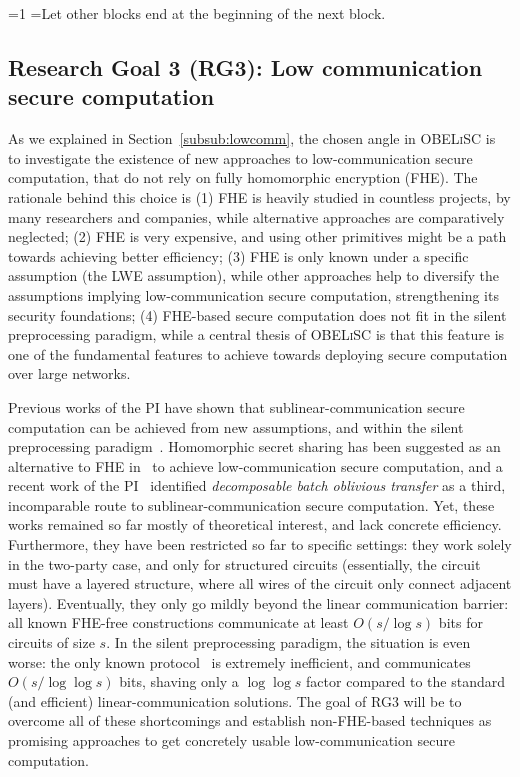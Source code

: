 \documentclass[oneside, a4paper, onecolumn, 11pt]{article}
\newcommand{\OBELiSC}{\textsc{OBELiSC}\xspace}
\newcounter{alphasect}
\def\alphainsection{0}
\newenvironment{alphasection}{%
  \ifnum\alphainsection=1%
    \errhelp={Let other blocks end at the beginning of the next block.}
    \errmessage{Nested Alpha section not allowed}
  \fi%
  \setcounter{alphasect}{0}
  \def\alphainsection{1}
}{%
  \setcounter{alphasect}{0}
  \def\alphainsection{0}
}%
\begin{document}
\begin{alphasection}
\subsection{Research Goal 3 (RG3): Low communication secure computation}

As we explained in Section~\ref{subsub:lowcomm}, the chosen angle in \OBELiSC is to investigate the existence of new approaches to low-communication secure computation, that do not rely on fully homomorphic encryption (FHE). The rationale behind this choice is (1) FHE is heavily studied in countless projects, by many researchers and companies, while alternative approaches are comparatively neglected; (2) FHE is very expensive, and using other primitives might be a path towards achieving better efficiency; (3) FHE is only known under a specific assumption (the LWE assumption), while other approaches help to diversify the assumptions implying low-communication secure computation, strengthening its security foundations; (4) FHE-based secure computation does not fit in the silent preprocessing paradigm, while a central thesis of \OBELiSC is that this feature is one of the fundamental features to achieve towards deploying secure computation over large networks.

Previous works of the PI have shown that sublinear-communication secure computation can be achieved from new assumptions, and within the silent preprocessing paradigm~\cite{EC:Couteau19,EC:CouMey21}. Homomorphic secret sharing has been suggested as an alternative to FHE in~\cite{C:BoyGilIsh16} to achieve low-communication secure computation, and a recent work of the PI~\cite{TCC:BoyCouMey22} identified \emph{decomposable batch oblivious transfer} as a third, incomparable route to sublinear-communication secure computation. Yet, these works remained so far mostly of theoretical interest, and lack concrete efficiency. Furthermore, they have been restricted so far to specific settings: they work solely in the two-party case, and only for structured circuits (essentially, the circuit must have a layered structure, where all wires of the circuit only connect adjacent layers). Eventually, they only go mildly beyond the linear communication barrier: all known FHE-free constructions communicate at least $O(s/\log s)$ bits for circuits of size $s$. In the silent preprocessing paradigm, the situation is even worse: the only known protocol~\cite{EC:CouMey21} is extremely inefficient, and communicates $O(s/\log\log s)$ bits, shaving only a $\log\log s$ factor compared to the standard (and efficient) linear-communication solutions. The goal of RG3 will be to overcome all of these shortcomings and establish non-FHE-based techniques as promising approaches to get concretely usable low-communication secure computation.


\end{alphasection}
\end{document}
